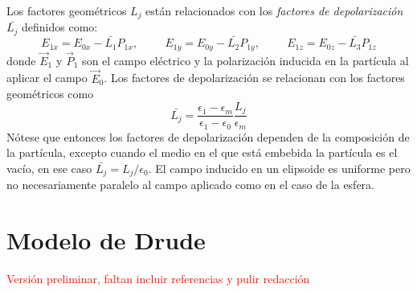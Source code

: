 \documentclass[paper=letter, fontsize=12pt,]{article}
\begin{document}
Los factores geométricos $L_j$ están relacionados con los \textit{factores de depolarización} $\bar{L_j}$ definidos como:
\begin{equation*}
    E_{1x}=E_{0x}-\bar{L_1}P_{1x},\hspace{1cm}    E_{1y}=E_{0y}-\bar{L_2}P_{1y},\hspace{1cm}    E_{1z}=E_{0z}-\bar{L_3}P_{1z}
\end{equation*}
donde $\Vec{E}_1$ y $\Vec{P}_1$ son el campo eléctrico y la polarización inducida en la partícula al aplicar el campo $\Vec{E}_0$. Los factores de depolarización se relacionan con los factores geométricos como \cite{Bohren}
\begin{equation*}
    \bar{L_j}=\frac{\epsilon_1-\epsilon_m}{\epsilon_1-\epsilon_0}\frac{L_j}{\epsilon_m}
\end{equation*}
Nótese que entonces los factores de depolarización dependen de la composición de la partícula, excepto cuando el medio en el que está embebida la partícula es el vacío, en ese caso $\bar{L_j}=L_j/\epsilon_0$. El campo inducido en un elipsoide es uniforme pero no necesariamente paralelo al campo aplicado como en el caso de la esfera.



\section{Modelo de Drude}
\textcolor{red}{Versión preliminar, faltan incluir referencias y pulir redacción}\\
 
\end{document}
